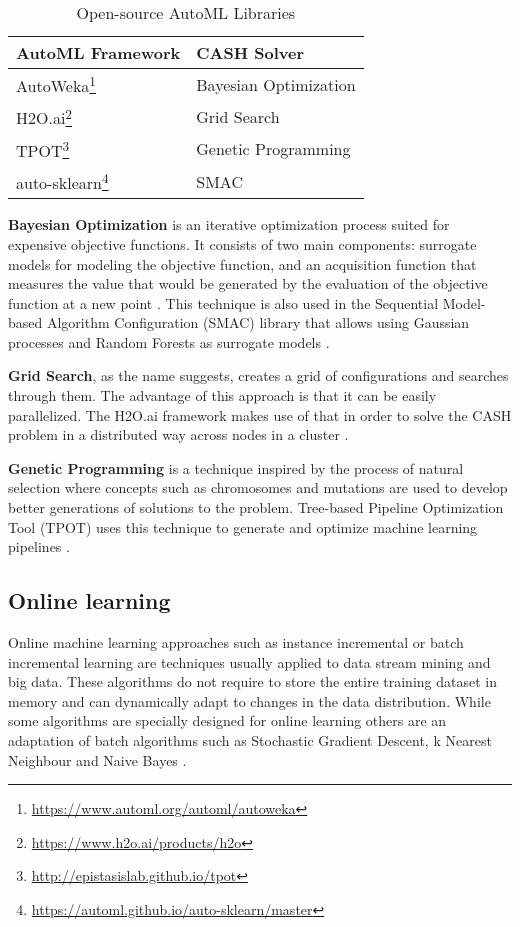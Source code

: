 \documentclass{sig-alternate-br}
\begin{document}
\begin{savenotes}
\begin{table}[h]
\renewcommand{\arraystretch}{1.25}
\centering
\begin{tabular}{|l|l|}
\hline
\textbf{AutoML Framework} & \textbf{CASH Solver} \\ \hline
AutoWeka\footnote{\url{https://www.automl.org/automl/autoweka}} & Bayesian Optimization \\ \hline
H2O.ai\footnote{\url{https://www.h2o.ai/products/h2o}} & Grid Search \\ \hline
TPOT\footnote{\url{http://epistasislab.github.io/tpot}} & Genetic Programming \\ \hline
auto-sklearn\footnote{\url{https://automl.github.io/auto-sklearn/master}} &  SMAC \\ \hline
\end{tabular}
\caption{Open-source AutoML Libraries}
\label{table:libraries}
\end{table}
\end{savenotes}

\textbf{Bayesian Optimization} is an iterative optimization process suited for expensive objective functions. It consists of two main components: surrogate models for modeling the objective function, and an acquisition function that measures the value that would be generated by the evaluation of the objective function at a new point \cite{zoller2019survey}. This technique is also used in the Sequential Model-based Algorithm Configuration (SMAC) library that allows using Gaussian processes and Random Forests as surrogate models \cite{feurer2015autosklearn}.

\textbf{Grid Search}, as the name suggests, creates a grid of configurations and searches through them. The advantage of this approach is that it can be easily parallelized. The H2O.ai framework makes use of that in order to solve the CASH problem in a distributed way across nodes in a cluster \cite{h2o}. 

\textbf{Genetic Programming} is a technique inspired by the process of natural selection where concepts such as chromosomes and mutations are used to develop better generations of solutions to the problem. Tree-based Pipeline Optimization Tool (TPOT) uses this technique to generate and optimize machine learning pipelines \cite{tpot}.

\subsection{Online learning}
Online machine learning approaches such as instance incremental or batch incremental learning are techniques usually applied to data stream mining and big data. These algorithms do not require to store the entire training dataset in memory and can dynamically adapt to changes in the data distribution. While some algorithms are specially designed for online learning \cite{bifet2012ensembles} others are an adaptation of batch algorithms such as Stochastic Gradient Descent, k Nearest Neighbour and Naive Bayes \cite{van2014algorithm}.
\end{document}

